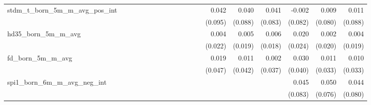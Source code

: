 \begin{tabular}{lrrrrrrrrrrrrrrrrrr}
stdm\_t\_born\_5m\_m\_avg\_pos\_int         &             &             &             &             &             &             &             &             &             &             &             &             &       0.042 &       0.040 &       0.041 &      -0.002 &       0.009 &       0.011 \\ 
                                            &             &             &             &             &             &             &             &             &             &             &             &             &     (0.095) &     (0.088) &     (0.083) &     (0.082) &     (0.080) &     (0.088) \\ 
hd35\_born\_5m\_m\_avg                      &             &             &             &             &             &             &             &             &             &             &             &             &       0.004 &       0.005 &       0.006 &       0.020 &       0.002 &       0.004 \\ 
                                            &             &             &             &             &             &             &             &             &             &             &             &             &     (0.022) &     (0.019) &     (0.018) &     (0.024) &     (0.020) &     (0.019) \\ 
fd\_born\_5m\_m\_avg                        &             &             &             &             &             &             &             &             &             &             &             &             &       0.019 &       0.011 &       0.002 &       0.030 &       0.011 &       0.010 \\ 
                                            &             &             &             &             &             &             &             &             &             &             &             &             &     (0.047) &     (0.042) &     (0.037) &     (0.040) &     (0.033) &     (0.033) \\ 
spi1\_born\_6m\_m\_avg\_neg\_int            &             &             &             &             &             &             &             &             &             &             &             &             &             &             &             &       0.045 &       0.050 &       0.044 \\ 
                                            &             &             &             &             &             &             &             &             &             &             &             &             &             &             &             &     (0.083) &     (0.076) &     (0.080) \\ 

\end{tabular}
